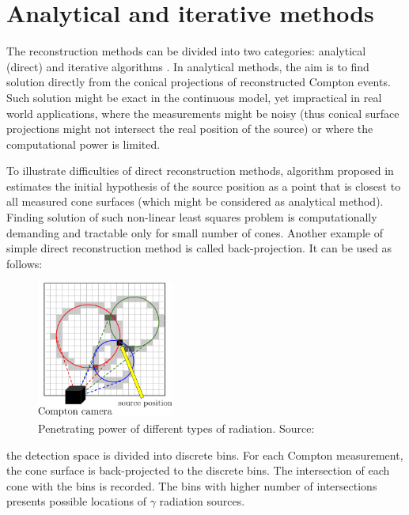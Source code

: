 \section{Analytical and iterative methods}
The reconstruction methods can be divided into two categories: analytical (direct) and iterative algorithms \cite{lojacono2}.
In analytical methods, the aim is to find solution directly from the conical projections of reconstructed Compton events.
Such solution might be exact in the continuous model, yet impractical in real world applications, where the measurements might be noisy (thus conical surface projections might not intersect the real position of the source) or where the computational power is limited.

To illustrate difficulties of direct reconstruction methods, algorithm proposed in \cite{baca2021gamma} estimates the initial hypothesis of the source position as a point that is closest to all measured cone surfaces (which might be considered as analytical method).
Finding solution of such non-linear least squares problem is computationally demanding and tractable only for small number of cones.
Another example of simple direct reconstruction method is called back-projection.
It can be used as follows:

  \begin{figure}[!h]
    \centering
      \includegraphics[width=0.4\textwidth]{./fig/photos/backprop.eps}
    \caption{Penetrating power of different types of radiation. Source: \cite{penetrating_power}}
  \end{figure}
the detection space is divided into discrete bins.
For each Compton measurement, the cone surface is back-projected to the discrete bins.
The intersection of each cone with the bins is recorded.
The bins with higher number of intersections presents possible locations of $\gamma$ radiation sources.

